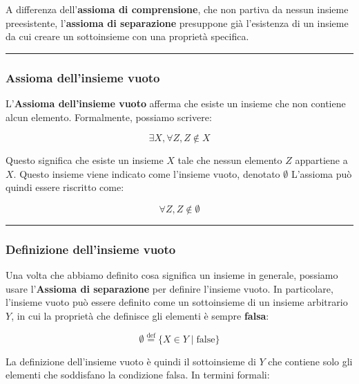 \documentclass[
  a4paper,
]{article}
\begin{document}
A differenza dell'\textbf{assioma di comprensione}, che non partiva da
nessun insieme preesistente, l'\textbf{assioma di separazione}
presuppone già l'esistenza di un insieme da cui creare un sottoinsieme
con una proprietà specifica.

\par\noindent\rule{\linewidth}{0.4pt}\par\vspace{6pt}

\hypertarget{assioma-dellinsieme-vuoto}{%
\subsubsection{Assioma dell'insieme
vuoto}\label{assioma-dellinsieme-vuoto}}

L'\textbf{Assioma dell'insieme vuoto} afferma che esiste un insieme che
non contiene alcun elemento. Formalmente, possiamo scrivere:

\[
\exists X, \forall Z, Z \notin X
\]

Questo significa che esiste un insieme \(X\) tale che nessun elemento
\(Z\) appartiene a \(X\). Questo insieme viene indicato come l'insieme
vuoto, denotato \(\emptyset\) L'assioma può quindi essere riscritto
come:

\[
\forall Z, Z \notin \emptyset
\]

\par\noindent\rule{\linewidth}{0.4pt}\par\vspace{6pt}

\hypertarget{definizione-dellinsieme-vuoto}{%
\subsubsection{Definizione dell'insieme
vuoto}\label{definizione-dellinsieme-vuoto}}

Una volta che abbiamo definito cosa significa un insieme in generale,
possiamo usare l'\textbf{Assioma di separazione} per definire l'insieme
vuoto. In particolare, l'insieme vuoto può essere definito come un
sottoinsieme di un insieme arbitrario \(Y\), in cui la proprietà che
definisce gli elementi è sempre \textbf{falsa}:

\[
\emptyset \overset{\mathrm{def}}{=} \{ X \in Y \mid \text{false} \}
\]

La definizione dell'insieme vuoto è quindi il sottoinsieme di \(Y\) che
contiene solo gli elementi che soddisfano la condizione falsa. In
termini formali:
\end{document}
